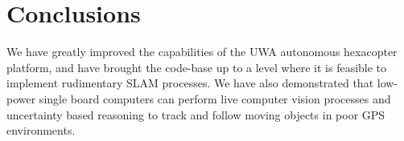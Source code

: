 \documentclass[a4paper, 11pt, titlepage]{article}
\begin{document}
\section{Conclusions}
  We have greatly improved the capabilities of the UWA autonomous hexacopter platform, and have brought the code-base up to a level where it is feasible to implement rudimentary SLAM processes.
  We have also demonstrated that low-power single board computers can perform live computer vision processes and uncertainty based reasoning to track and follow moving objects in poor GPS environments. 





\renewcommand{\refname}{References}


%


\begin{appendices}
%    

\end{appendices}

  
\end{document}
